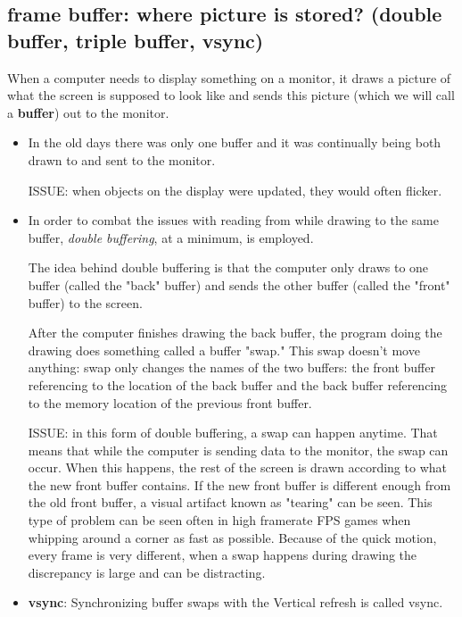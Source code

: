 


\subsection{frame buffer: where picture is stored? (double buffer, triple
buffer, vsync)}
\label{sec:frame-buffer}
\label{sec:double-buffer-frame-buffer}
\label{sec:triple-buffer-frame-buffer}

When a computer needs to display something on a monitor, it draws a picture of
what the screen is supposed to look like and sends this picture (which we will
call a {\bf buffer}) out to the monitor.

\begin{itemize}
  \item  In the old days there was only one buffer and it was continually being
  both drawn to and sent to the monitor. 

ISSUE: when objects on the display were updated, they would often flicker.
  
  \item In order to combat the issues with reading from while drawing to the
  same buffer, {\it double buffering}, at a minimum, is employed.

The idea behind double buffering is that the computer only draws to one buffer
(called the "back" buffer) and sends the other buffer (called the "front"
buffer) to the screen. 

 After the computer finishes drawing the back buffer, the program doing the
drawing does something called a buffer "swap." This swap doesn't move anything:
swap only changes the names of the two buffers: the front buffer referencing
to the location of the back buffer and the back buffer referencing to the
memory location of the previous front buffer.

ISSUE: in this form of double buffering, a swap can happen anytime. That means
that while the computer is sending data to the monitor, the swap can occur. When
this happens, the rest of the screen is drawn according to what the new front
buffer contains. If the new front buffer is different enough from the old front
buffer, a visual artifact known as "tearing" can be seen. 
This type of problem can be seen often in high framerate FPS games when whipping
around a corner as fast as possible.  Because of the quick motion, every frame
is very different, when a swap happens during drawing the discrepancy is large
and can be distracting. 

  \item {\bf vsync}: Synchronizing buffer swaps with the Vertical refresh is
  called vsync.
  

\end{itemize}
